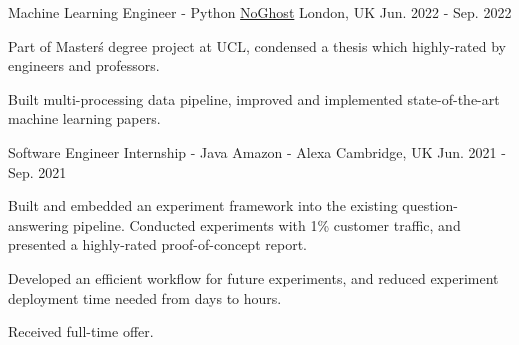 

\begin{cventries}


\cventry
      {Machine Learning Engineer - Python} %
      {\href{https://www.noghost.co.uk/}{NoGhost}} %
      {London, UK} %
      {Jun. 2022 - Sep. 2022} %
      {
        \begin{cvitems} %
          \item {Part of Master\'s degree project at UCL, condensed a thesis which highly-rated by engineers and professors.}
          \item {Built multi-processing data pipeline, improved and implemented state-of-the-art machine learning papers.}
        \end{cvitems}
      }

  \cventry
    {Software Engineer Internship - Java} %
    {Amazon - Alexa} %
    {Cambridge, UK} %
    {Jun. 2021 - Sep. 2021} %
    {
      \begin{cvitems} %
        \item {Built and embedded an experiment framework into the existing question-answering pipeline. Conducted experiments with 1\% customer traffic, and presented a highly-rated proof-of-concept report.}
        \item {Developed an efficient workflow for future experiments, and reduced experiment deployment time needed from days to hours.}
        \item {Received full-time offer.}
      \end{cvitems}
    }


\end{cventries}
